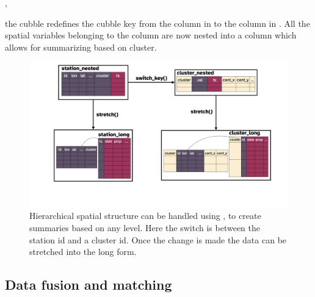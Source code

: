 \documentclass[
]{jss}
\begin{document}
,

the cubble redefines the cubble key from the  column in  to the  column in . All the spatial variables belonging to the  column are now nested into a  column which allows for summarizing based on cluster.

\begin{CodeChunk}
\begin{figure}

{\centering \includegraphics[width=1\linewidth,height=0.4\textheight]{../figures/diagram-keynotes/diagram-keynotes.002} 

}

\caption[Hierarchical spatial structure can be handled using , to create summaries based on any level]{Hierarchical spatial structure can be handled using , to create summaries based on any level. Here the switch is between the station id and a cluster id. Once the change is made the data can be stretched into the long form.}\label{fig:illu-hier}
\end{figure}
\end{CodeChunk}

\hypertarget{matching}{%
\subsection{Data fusion and matching}\label{matching}}
\end{document}
